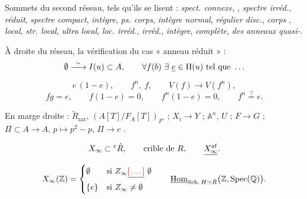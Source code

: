 \documentclass[11pt,a4paper]{article}
\begin{document}

Sommets du second réseau, tels qu'ils se lisent : \emph{spect. connexe},
\emph{}, \emph{spectre irréd.}, \emph{réduit},
\emph{spectre compact}, \emph{intègre}, \emph{ps. corps}, \emph{intègre
normal}, \emph{régulier disc.}, \emph{corps} ,
\emph{local}, \emph{str. local}, \emph{ultra local}, \emph{loc. irréd.},
\emph{irréd.}, \emph{\ill{} intègre}, \emph{complète}, \emph{\ill{} des anneaux
\ill{} quasi-\ill{}}.

À droite du réseau, la vérification du cas « anneau réduit » :
\[
  \emptyset \xrightarrow{\ \sim\ } I(u) \subset A, \qquad
  \forall f(b)\ \exists\ \struck{e} \in \Pi(u) \text{ tel que } \ldots
\]
\[
  e\,(1-e), \qquad f^{n},\ f, \qquad V(f) \longrightarrow V(f^{n}) ,
\]
\[
  fg = e, \qquad f(1-e) = 0, \qquad f^{n}(1-e) = 0, \qquad f^{n} \overset{?}{=} e .
\]

En marge droite : $\tilde{R}_{\mathrm{zar}}$, $(A[T]/F_{A}[T])_{F'}$ ;
$X_{i} \to Y$ ; $\mathbb{A}^{n}$, $U$ ; $F \to G$ ; $\Pi \subset A \to A$,
$p \mapsto p^{2} - p$, $\Pi \to e$ .

\[
  X_{\infty} \subset {}^{e}\hat{R}, \qquad \text{crible de } R,
  \qquad \struck{X_{\infty}^{\mathrm{af}}} .
\]
\[
  X_{\infty}(\mathbb{Z}) =
  \begin{cases}
    \emptyset & \text{si } Z_{\infty} \struck{\ill{}}\ \emptyset \\
    \{e\} & \text{si } Z_{\infty} \neq \emptyset
  \end{cases}
  \qquad
  \underline{\mathrm{Hom}}_{\mathrm{Sch.}\,H \simeq \hat{R}}
    \bigl(\mathbb{Z}, \mathrm{Spec}(\mathbb{Q})\bigr) .
\]
\end{document}

